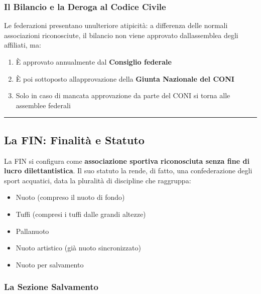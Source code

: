 \documentclass[a4paper,11pt]{article}
\providecommand{\tightlist}{%
  \setlength{\itemsep}{0pt}\setlength{\parskip}{0pt}}
\begin{document}
\subsubsection{Il Bilancio e la Deroga al Codice
      Civile}\label{il-bilancio-e-la-deroga-al-codice-civile}

Le federazioni presentano un\textquotesingle ulteriore atipicità: a
differenza delle normali associazioni riconosciute, il bilancio non
viene approvato dall\textquotesingle assemblea degli affiliati, ma:

\begin{enumerate}
      \tightlist
      \item
            È approvato annualmente dal \textbf{Consiglio federale}
      \item
            È poi sottoposto all\textquotesingle approvazione della \textbf{Giunta
                  Nazionale del CONI}
      \item
            Solo in caso di mancata approvazione da parte del CONI si torna alle
            assemblee federali
\end{enumerate}

\begin{center}\rule{0.5\linewidth}{0.5pt}\end{center}

\subsection{La FIN: Finalità e
      Statuto}\label{la-fin-finalituxe0-e-statuto}

La FIN si configura come \textbf{associazione sportiva riconosciuta
      senza fine di lucro dilettantistica}. Il suo statuto la rende, di fatto,
una confederazione degli sport acquatici, data la pluralità di
discipline che raggruppa:

\begin{itemize}
      \tightlist
      \item
            Nuoto (compreso il nuoto di fondo)
      \item
            Tuffi (compresi i tuffi dalle grandi altezze)
      \item
            Pallanuoto
      \item
            Nuoto artistico (già nuoto sincronizzato)
      \item
            Nuoto per salvamento
\end{itemize}

\subsubsection{La Sezione Salvamento}\label{la-sezione-salvamento}
\end{document}
